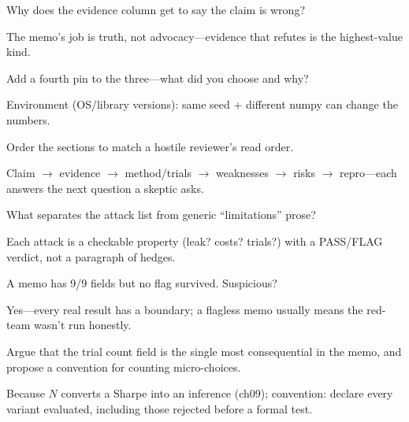 \begin{exercise}
Why does the evidence column get to say the claim is wrong?
\end{exercise}
\begin{solution}
The memo's job is truth, not advocacy---evidence that refutes is the highest-value kind.
\end{solution}

\begin{exercise}
Add a fourth pin to the three---what did you choose and why?
\end{exercise}
\begin{solution}
Environment (OS/library versions): same seed + different numpy can change the numbers.
\end{solution}

\begin{exercise}
Order the sections to match a hostile reviewer's read order.
\end{exercise}
\begin{solution}
Claim $\to$ evidence $\to$ method/trials $\to$ weaknesses $\to$ risks $\to$ repro---each
answers the next question a skeptic asks.
\end{solution}

\begin{exercise}
What separates the attack list from generic ``limitations'' prose?
\end{exercise}
\begin{solution}
Each attack is a checkable property (leak? costs? trials?) with a PASS/FLAG verdict,
not a paragraph of hedges.
\end{solution}

\begin{exercise}
A memo has 9/9 fields but no flag survived. Suspicious?
\end{exercise}
\begin{solution}
Yes---every real result has a boundary; a flagless memo usually means the red-team
wasn't run honestly.
\end{solution}

\begin{exercise}[hard]
Argue that the trial count field is the single most consequential in the memo, and
propose a convention for counting micro-choices.
\end{exercise}
\begin{solution}
Because $N$ converts a Sharpe into an inference (ch09); convention: declare every
variant evaluated, including those rejected before a formal test.
\end{solution}

